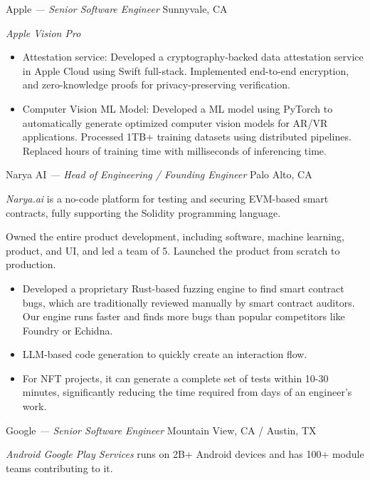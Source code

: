\documentclass[]{friggeri-cv}
\begin{document}
\begin{entrylist}
  {Apple \emph{--- Senior Software Engineer}}
  {Sunnyvale, CA}
  {
    \emph{Apple Vision Pro}
    \begin{itemize}
      \item Attestation service:
      Developed a cryptography-backed data attestation service in Apple Cloud using Swift full-stack.
      Implemented end-to-end encryption, and zero-knowledge proofs for privacy-preserving verification.
      \item Computer Vision ML Model:
      Developed a ML model using PyTorch to automatically generate optimized 
      computer vision models for AR/VR applications.
      Processed 1TB+ training datasets using distributed pipelines.
      Replaced hours of training time with milliseconds of inferencing time.
    \end{itemize}
  }
  {Narya AI \emph{--- Head of Engineering / Founding Engineer}}
  {Palo Alto, CA}
  {
    \emph{Narya.ai} is a no-code platform for testing and securing EVM-based smart contracts,
    fully supporting the Solidity programming language.

    Owned the entire product development, including software, machine learning, product, and UI, and led a team of 5.
    Launched the product from scratch to production.

    \begin{itemize}
      \item Developed a proprietary Rust-based fuzzing engine to find smart contract bugs,
      which are traditionally reviewed manually by smart contract auditors.
      Our engine runs faster and finds more bugs than popular competitors like Foundry or Echidna.
      \item LLM-based code generation to quickly create an interaction flow.
      \item For NFT projects, it can generate a complete set of tests within 10-30 minutes,
      significantly reducing the time required from days of an engineer's work.
    \end{itemize}
  }
  {Google \emph{--- Senior Software Engineer}}
  {Mountain View, CA / Austin, TX}
  {
    \emph{Android Google Play Services} runs on 2B+ Android devices and has 100+ module teams contributing to it.

}
\end{entrylist}
\end{document}
